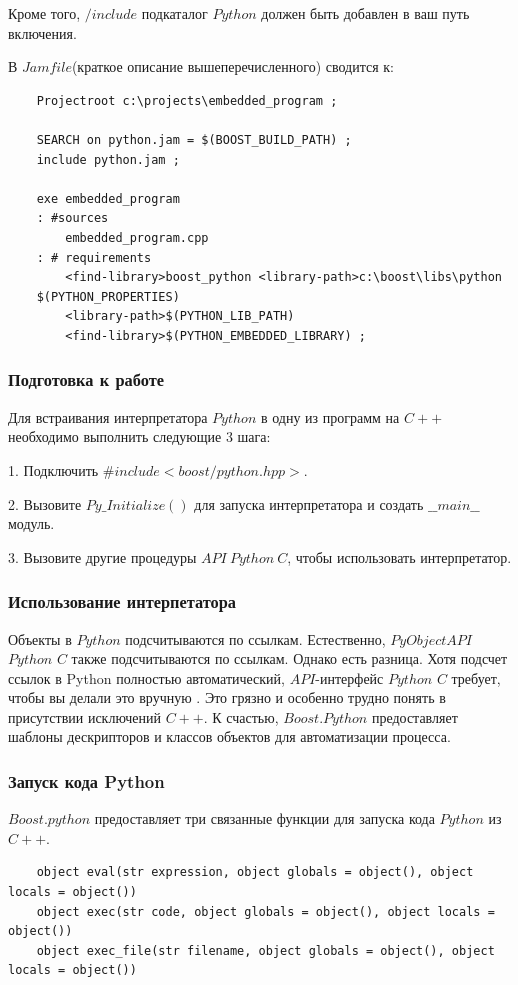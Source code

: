 \documentclass[a4paper, 14pt]{extarticle}
\makeatletter
\newcommand{\verbatimfont}[1]{\renewcommand{\verbatim@font}{\ttfamily#1}}
\makeatother
\begin{document}
Кроме того, $/include$ подкаталог $Python$ должен быть добавлен в ваш путь включения.

В $Jamfile$(краткое описание вышеперечисленного) сводится к:
\begin{verbatim}
    Projectroot c:\projects\embedded_program ;

    SEARCH on python.jam = $(BOOST_BUILD_PATH) ;
    include python.jam ;

    exe embedded_program
    : #sources
        embedded_program.cpp
    : # requirements
        <find-library>boost_python <library-path>c:\boost\libs\python
    $(PYTHON_PROPERTIES)
        <library-path>$(PYTHON_LIB_PATH)
        <find-library>$(PYTHON_EMBEDDED_LIBRARY) ;
\end{verbatim}

\subsubsection{Подготовка к работе}
Для встраивания интерпретатора $Python$ в одну из программ на $C++$ необходимо выполнить следующие 3 шага:

1. Подключить $\#include <boost/python.hpp>$.

2. Вызовите $Py\_Initialize()$ для запуска интерпретатора и создать $\_\_main\_\_$  модуль.

3. Вызовите другие процедуры $API\ Python\ C$, чтобы использовать интерпретатор.

\subsubsection{Использование интерпетатора}
Объекты в $Python$ подсчитываются по ссылкам. Естественно, $PyObjectAPI$ $Python$ $C$ также подсчитываются по ссылкам. Однако есть разница. Хотя подсчет ссылок в Python полностью автоматический, $API$-интерфейс $Python$ $C$ требует, чтобы вы делали это вручную . Это грязно и особенно трудно понять в присутствии исключений $C++$. К счастью, $Boost.Python$ предоставляет шаблоны дескрипторов и классов объектов для автоматизации процесса.

\subsubsection{Запуск кода Python}
$Boost.python$ предоставляет три связанные функции для запуска кода $Python$ из $C++$.
\verbatimfont{\small}
\begin{verbatim}
    object eval(str expression, object globals = object(), object locals = object())
    object exec(str code, object globals = object(), object locals = object())
    object exec_file(str filename, object globals = object(), object locals = object())
\end{verbatim}
\end{document}
